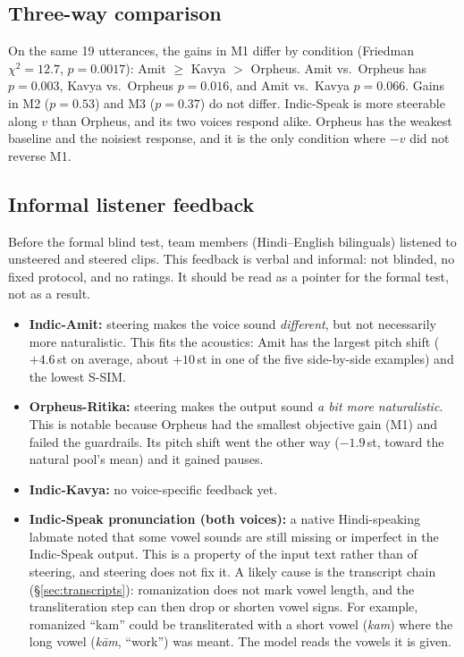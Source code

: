 \documentclass[11pt]{article}
\begin{document}
\subsection{Three-way comparison}
On the same 19 utterances, the gains in M1 differ by condition (Friedman $\chi^2=12.7$, $p=0.0017$): Amit $\ge$ Kavya $>$ Orpheus. Amit vs.\ Orpheus has $p=0.003$, Kavya vs.\ Orpheus $p=0.016$, and Amit vs.\ Kavya $p=0.066$. Gains in M2 ($p=0.53$) and M3 ($p=0.37$) do not differ. Indic-Speak is more steerable along $v$ than Orpheus, and its two voices respond alike. Orpheus has the weakest baseline and the noisiest response, and it is the only condition where $-v$ did not reverse M1.

\subsection{Informal listener feedback}\label{sec:informal}
Before the formal blind test, team members (Hindi--English bilinguals) listened to unsteered and steered clips. This feedback is verbal and informal: not blinded, no fixed protocol, and no ratings. It should be read as a pointer for the formal test, not as a result.
\begin{itemize}
\item \textbf{Indic-Amit:} steering makes the voice sound \emph{different}, but not necessarily more naturalistic. This fits the acoustics: Amit has the largest pitch shift ($+4.6$\,st on average, about $+10$\,st in one of the five side-by-side examples) and the lowest S-SIM.
\item \textbf{Orpheus-Ritika:} steering makes the output sound \emph{a bit more naturalistic}. This is notable because Orpheus had the smallest objective gain (M1) and failed the guardrails. Its pitch shift went the other way ($-1.9$\,st, toward the natural pool's mean) and it gained pauses.
\item \textbf{Indic-Kavya:} no voice-specific feedback yet.
\item \textbf{Indic-Speak pronunciation (both voices):} a native Hindi-speaking labmate noted that some vowel sounds are still missing or imperfect in the Indic-Speak output. This is a property of the input text rather than of steering, and steering does not fix it. A likely cause is the transcript chain (\S\ref{sec:transcripts}): romanization does not mark vowel length, and the transliteration step can then drop or shorten vowel signs. For example, romanized ``kam'' could be transliterated with a short vowel (\emph{kam}) where the long vowel (\emph{k\=am}, ``work'') was meant. The model reads the vowels it is given.
\end{itemize}
\end{document}
